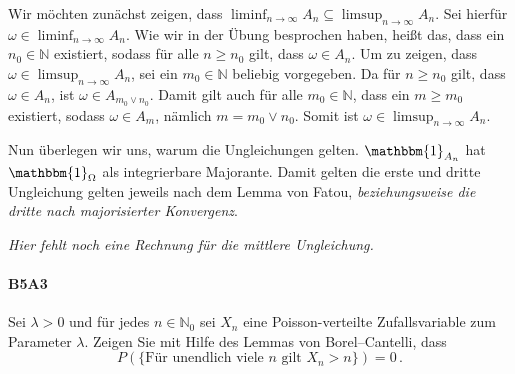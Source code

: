\documentclass{article}
\begin{document}
Wir möchten zunächst zeigen, dass $\liminf_{n\to\infty}A_n\subseteq\limsup_{n\to\infty}A_n$.
Sei hierfür $\omega\in\liminf_{n\to\infty}A_n$. Wie wir in der Übung besprochen haben, heißt das, dass ein $n_0\in\mathbb{N}$ existiert, sodass für alle $n\geq n_0$ gilt, dass $\omega\in A_n$.
Um zu zeigen, dass $\omega\in\limsup_{n\to\infty}A_n$, sei ein $m_0\in\mathbb{N}$ beliebig vorgegeben.
Da für $n\geq n_0$ gilt, dass $\omega\in A_n$, ist $\omega\in A_{m_0\vee n_0}$.
Damit gilt auch für alle $m_0\in\mathbb{N}$, dass ein $m\geq m_0$ existiert, sodass $\omega\in A_m$, nämlich $m=m_0\vee n_0$.
Somit ist $\omega\in\limsup_{n\to\infty}A_n$.

Nun überlegen wir uns, warum die Ungleichungen gelten.
$\mathbbm{1}_{A_n}$ hat $\mathbbm{1}_\Omega$ als integrierbare Majorante.
Damit gelten die erste und dritte Ungleichung gelten jeweils nach dem Lemma von Fatou, \emph{beziehungsweise die dritte nach majorisierter Konvergenz}.

\emph{Hier fehlt noch eine Rechnung für die mittlere Ungleichung.}
\newpage

\paragraph{B5A3}
Sei $\lambda>0$ und für jedes $n\in\mathbb{N}_0$ sei $X_n$ eine Poisson-verteilte Zufallsvariable zum Parameter $\lambda$.
Zeigen Sie mit Hilfe des Lemmas von Borel--Cantelli, dass
\[
  P(\{\text{Für unendlich viele $n$ gilt $X_n>n$}\})=0\,.
\]
\end{document}
